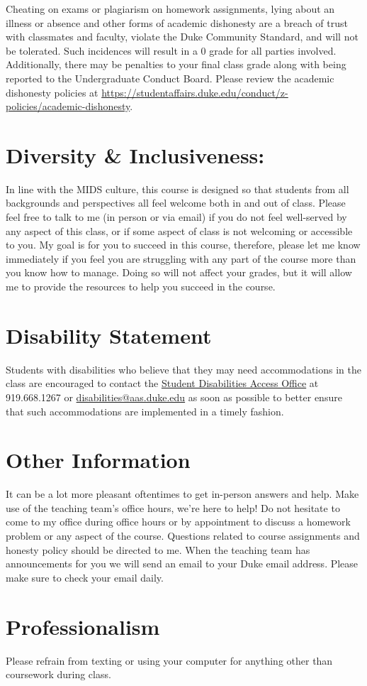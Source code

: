 \documentclass[11pt, a4paper]{article}
\begin{document}
Cheating on exams or plagiarism on homework assignments, lying about an illness or absence and other forms of academic dishonesty are a breach of trust with classmates and faculty, violate the Duke Community Standard, and will not be tolerated. Such incidences will result in a 0 grade for all parties involved. Additionally, there may be penalties to your final class grade along with being reported to the Undergraduate Conduct Board. Please review the academic dishonesty policies at \url{https://studentaffairs.duke.edu/conduct/z-policies/academic-dishonesty}.


\section{Diversity \& Inclusiveness:}
In line with the MIDS culture, this course is designed so that students from all backgrounds and perspectives all feel welcome both in and out of class. Please feel free to talk to me (in person or via email) if you do not feel well-served by any aspect of this class, or if some aspect of class is not welcoming or accessible to you. My goal is for you to succeed in this course, therefore, please let me know immediately if you feel you are struggling with any part of the course more than you know how to manage. Doing so will not affect your grades, but it will allow me to provide the resources to help you succeed in the course.


\section{Disability Statement} 
Students with disabilities who believe that they may need accommodations in the class are encouraged to contact the \href{https://access.duke.edu/students/staff.php}{Student Disabilities Access Office} at 919.668.1267 or \href{mailto:disabilities@aas.duke.edu}{disabilities@aas.duke.edu}  as soon as possible to better ensure that such accommodations are implemented in a timely fashion.


\section{Other Information} 
It can be a lot more pleasant oftentimes to get in-person answers and help. Make use of the teaching team's office hours, we're here to help! Do not hesitate to come to my office during office hours or by appointment to discuss a homework problem or any aspect of the course.  Questions related to course assignments and honesty policy should be directed to me. When the teaching team has announcements for you we will send an email to your Duke email address. Please make sure to check your email daily.


\section{Professionalism}
Please refrain from texting or using your computer for anything other than coursework during class.
\end{document}
